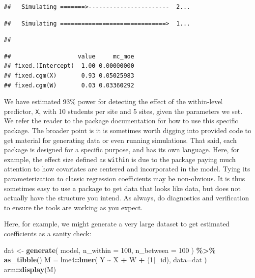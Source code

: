 \documentclass[
]{book}
\newenvironment{Shaded}{\begin{snugshade}}{\end{snugshade}}
\newcommand{\AttributeTok}[1]{\textcolor[rgb]{0.13,0.29,0.53}{#1}}
\newcommand{\DecValTok}[1]{\textcolor[rgb]{0.00,0.00,0.81}{#1}}
\newcommand{\FunctionTok}[1]{\textcolor[rgb]{0.13,0.29,0.53}{\textbf{#1}}}
\newcommand{\NormalTok}[1]{#1}
\newcommand{\OtherTok}[1]{\textcolor[rgb]{0.56,0.35,0.01}{#1}}
\newcommand{\SpecialCharTok}[1]{\textcolor[rgb]{0.81,0.36,0.00}{\textbf{#1}}}
\newcommand{\StringTok}[1]{\textcolor[rgb]{0.31,0.60,0.02}{#1}}
\begin{document}
\begin{verbatim}
##   Simulating =======>-----------------------  2...
\end{verbatim}

\begin{verbatim}
##   Simulating ==============================>  1...
\end{verbatim}

\begin{verbatim}
## 
\end{verbatim}

\begin{verbatim}
##                   value     mc_moe
## fixed.(Intercept)  1.00 0.00000000
## fixed.cgm(X)       0.93 0.05025983
## fixed.cgm(W)       0.03 0.03360292
\end{verbatim}

We have estimated 93\% power for detecting the effect of the within-level predictor, \texttt{X}, with 10 students per site and 5 sites, given the parameters we set.
We refer the reader to the package documentation for how to use this specific package.
The broader point is it is sometimes worth digging into provided code to get material for generating data or even running simulations.
That said, each package is designed for a specific purpose, and has its own language.
Here, for example, the effect size defined as \texttt{within} is due to the package paying much attention to how covariates are centered and incorporated in the model.
Tying its parameterization to classic regression coefficients may be non-obvious.
It is thus sometimes easy to use a package to get data that looks like data, but does not actually have the structure you intend.
As always, do diagnostics and verification to ensure the tools are working as you expect.

Here, for example, we might generate a very large dataset to get estimated coefficients as a sanity check:

\begin{Shaded}
\begin{Highlighting}[]
\NormalTok{dat }\OtherTok{\textless{}{-}} \FunctionTok{generate}\NormalTok{( model, }
                 \AttributeTok{n\_within =} \DecValTok{100}\NormalTok{, }
                 \AttributeTok{n\_between =} \DecValTok{100}\NormalTok{ ) }\SpecialCharTok{\%\textgreater{}\%}
  \FunctionTok{as\_tibble}\NormalTok{()}
\NormalTok{M }\OtherTok{=}\NormalTok{ lme4}\SpecialCharTok{::}\FunctionTok{lmer}\NormalTok{( Y }\SpecialCharTok{\textasciitilde{}}\NormalTok{ X }\SpecialCharTok{+}\NormalTok{ W }\SpecialCharTok{+}\NormalTok{ (}\DecValTok{1}\SpecialCharTok{|}\StringTok{\textasciigrave{}}\AttributeTok{\_id}\StringTok{\textasciigrave{}}\NormalTok{), }\AttributeTok{data=}\NormalTok{dat )}
\NormalTok{arm}\SpecialCharTok{::}\FunctionTok{display}\NormalTok{(M)}
\end{Highlighting}
\end{Shaded}
\end{document}
